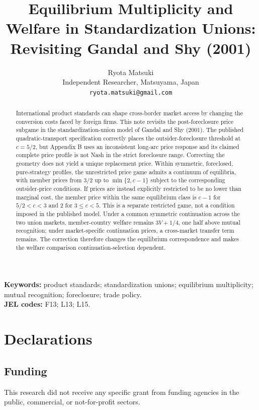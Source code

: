 \documentclass[11pt]{article}
\title{Equilibrium Multiplicity and Welfare in Standardization Unions:\\Revisiting Gandal and Shy (2001)}
\author{Ryota Matsuki\\
Independent Researcher, Matsuyama, Japan\\
\texttt{ryota.matsuki@gmail.com}}
\date{}
\begin{document}
\maketitle

\begin{abstract}
International product standards can shape cross-border market access by changing the conversion costs faced by foreign firms. This note revisits the post-foreclosure price subgame in the standardization-union model of Gandal and Shy (2001). The published quadratic-transport specification correctly places the outsider-foreclosure threshold at $c=5/2$, but Appendix B uses an inconsistent long-arc price response and its claimed complete price profile is not Nash in the strict foreclosure range. Correcting the geometry does not yield a unique replacement price. Within symmetric, foreclosed, pure-strategy profiles, the unrestricted price game admits a continuum of equilibria, with member prices from $3/2$ up to $\min\{2,c-1\}$ subject to the corresponding outsider-price conditions. If prices are instead explicitly restricted to be no lower than marginal cost, the member price within the same equilibrium class is $c-1$ for $5/2<c<3$ and $2$ for $3\leq c<5$. This is a separate restricted game, not a condition imposed in the published model. Under a common symmetric continuation across the two union markets, member-country welfare remains $3V+1/4$, one half above mutual recognition; under market-specific continuation prices, a cross-market transfer term remains. The correction therefore changes the equilibrium correspondence and makes the welfare comparison continuation-selection dependent.
\end{abstract}

\noindent\textbf{Keywords:} product standards; standardization unions; equilibrium multiplicity; mutual recognition; foreclosure; trade policy.\\
\textbf{JEL codes:} F13; L13; L15.







\section*{Declarations}

\subsection*{Funding}
This research did not receive any specific grant from funding agencies in the public, commercial, or not-for-profit sectors.
\end{document}
